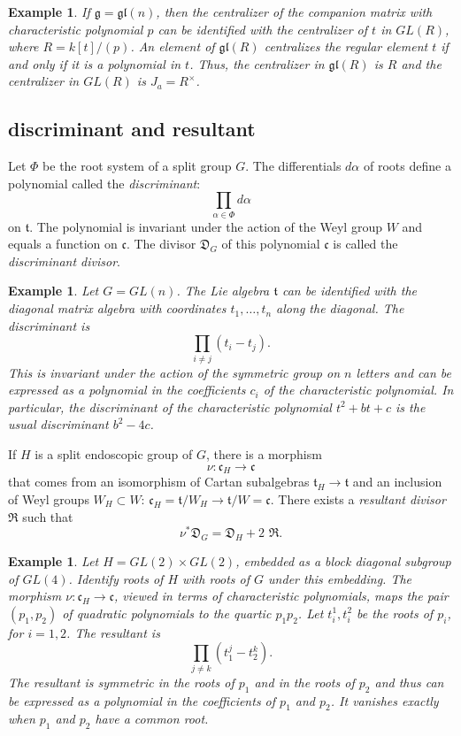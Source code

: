 \documentclass[brochure,english,12pt]{bourbaki}
\theoremstyle{plain}
\newtheorem{example}[equation]{Example}
\def\gl{\mathfrak{gl}}
\def\g{\mathfrak{g}}
\def\t{\mathfrak{t}}
\def\cc{\mathfrak{c}}
\def\DIV{{\mathfrak{D}}}
\def\RDIV{{\mathfrak{R}}}
\begin{document}
\begin{example}
  If $\g=\gl(n)$, then the centralizer of the companion matrix with
  characteristic polynomial $p$ can be identified with the centralizer
  of $t$ in $GL(R)$, where $R=k[t]/(p)$.  An
  element of $\gl(R)$ centralizes the regular element $t$ if and only if it is a polynomial
  in $t$.  Thus, the centralizer in $\gl(R)$ is $R$ and the centralizer in $GL(R)$
 is $J_a = R^\times$.
\end{example}


\subsection{discriminant and resultant}

Let $\Phi$ be the root system of a split group $G$.  The differentials $d\alpha$ of 
roots define a  polynomial called the {\it discriminant}:
\begin{equation}\label{eqn:disc}
\prod_{\alpha\in\Phi} d\alpha
\end{equation}
on $\t$.  The polynomial is invariant under the action of the Weyl group 
$W$ and equals a function on $\cc$.
The divisor $\DIV_G$ of this polynomial $\cc$ is called the {\it discriminant divisor}.

\begin{example} Let $G=GL(n)$.  The Lie algebra $\t$ 
  can be identified with the diagonal matrix algebra with coordinates
  $t_1,\ldots,t_n$ along the diagonal.  The discriminant is
\[\prod_{i\ne j} (t_i - t_j).\]
This  is invariant under the action of the symmetric group on $n$ letters 
and can be expressed as a polynomial in the coefficients $c_i$ of the characteristic polynomial.
In particular, the discriminant of the characteristic polynomial $t^2 + b t + c$ is the usual
discriminant $b^2 - 4 c$.
\end{example}

If $H$ is a split endoscopic group of $G$, there is a morphism 
\begin{equation}\label{eqn:nu}
\nu:\cc_H\to \cc
\end{equation}
that comes from an isomorphism of Cartan subalgebras $\t_H\to\t$ and an inclusion
of Weyl groups $W_H\subset W$: $\cc_H = \t/W_H \to \t/W= \cc$.
There exists
a {\it resultant divisor} $\RDIV$ such that
\begin{equation}
\nu^*\DIV_G = \DIV_H + 2\,\, \RDIV.
\end{equation}

\begin{example} Let $H=GL(2)\times GL(2)$, embedded as a block
  diagonal subgroup of $GL(4)$.  Identify roots of $H$ with roots of $G$ under this embedding.
 The morphism $\nu:\cc_H\to \cc$,
  viewed in terms of characteristic polynomials, maps the pair
  $(p_1,p_2)$ of quadratic polynomials to the quartic $p_1p_2$.  Let
  $t^1_i,t^2_i$ be the roots of $p_i$, for $i=1,2$.  The resultant is
\[
\prod_{j\ne k} (t^j_1 - t^k_2).
\]
  The
resultant is symmetric in the roots of $p_1$ and in the roots of $p_2$
and thus can be expressed as a polynomial  in the coefficients
of $p_1$ and $p_2$.  It vanishes exactly when $p_1$ and $p_2$ have a common root.
\end{example}
\end{document}
